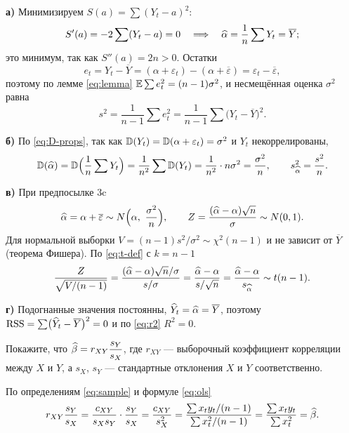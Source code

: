 \begin{solution}
\textbf{а)} Минимизируем $S(a) = \sum(Y_t - a)^2$:
\[
  S'(a) = -2\sum(Y_t - a) = 0
  \quad\Longrightarrow\quad
  \widehat{\alpha} = \frac{1}{n}\sum Y_t = \overline{Y};
\]
это минимум, так как $S''(a) = 2n > 0$. Остатки
\[
  e_t = Y_t - \overline{Y} = (\alpha + \varepsilon_t) - (\alpha + \overline{\varepsilon})
      = \varepsilon_t - \overline{\varepsilon},
\]
поэтому по лемме \eqref{eq:lemma} $\mathbb{E}\sum e_t^2 = (n-1)\sigma^2$, и несмещённая
оценка $\sigma^2$ равна
\[
  s^2 = \frac{1}{n-1}\sum e_t^2 = \frac{1}{n-1}\sum\bigl(Y_t - \overline{Y}\bigr)^2 .
\]

\medskip
\textbf{б)} По \eqref{eq:D-props}, так как $\mathbb{D}(Y_t) = \mathbb{D}(\alpha + \varepsilon_t) = \sigma^2$
и $Y_t$ некоррелированы,
\[
  \mathbb{D}(\widehat{\alpha}) = \mathbb{D}\Bigl(\frac{1}{n}\sum Y_t\Bigr) = \frac{1}{n^2}\sum\mathbb{D}(Y_t)
  = \frac{1}{n^2}\cdot n\sigma^2 = \frac{\sigma^2}{n},
  \qquad
  s_{\widehat{\alpha}}^2 = \frac{s^2}{n}.
\]

\medskip
\textbf{в)} При предпосылке 3c
\[
  \widehat{\alpha} = \alpha + \overline{\varepsilon} \sim N\Bigl(\alpha,\ \frac{\sigma^2}{n}\Bigr),
  \qquad
  Z = \frac{(\widehat{\alpha} - \alpha)\sqrt{n}}{\sigma} \sim N(0,1).
\]
Для нормальной выборки $V = (n-1)s^2/\sigma^2 \sim \chi^2(n-1)$ и не зависит от
$\overline{Y}$ (теорема Фишера). По \eqref{eq:t-def} с $k = n-1$
\[
  \frac{Z}{\sqrt{V/(n-1)}} = \frac{(\widehat{\alpha} - \alpha)\sqrt{n}/\sigma}{s/\sigma}
  = \frac{\widehat{\alpha} - \alpha}{s/\sqrt{n}} = \frac{\widehat{\alpha} - \alpha}{s_{\widehat{\alpha}}} \sim t(n-1).
\]

\medskip
\textbf{г)} Подогнанные значения постоянны, $\widehat{Y}_t = \widehat{\alpha} = \overline{Y}$, поэтому
$\mathrm{RSS} = \sum\bigl(\widehat{Y}_t - \overline{Y}\bigr)^2 = 0$ и по \eqref{eq:r2} $R^2 = 0$.
\end{solution}


Покажите, что $\widehat{\beta} = r_{XY}\dfrac{s_Y}{s_X}$, где $r_{XY}$ — выборочный
коэффициент корреляции между $X$ и $Y$, а $s_X$, $s_Y$ — стандартные отклонения
$X$ и $Y$ соответственно.

\begin{solution}
По определениям \eqref{eq:sample} и формуле \eqref{eq:ols}
\[
  r_{XY}\frac{s_Y}{s_X}
  = \frac{c_{XY}}{s_Xs_Y}\cdot\frac{s_Y}{s_X}
  = \frac{c_{XY}}{s_X^2}
  = \frac{\sum x_ty_t/(n-1)}{\sum x_t^2/(n-1)}
  = \frac{\sum x_ty_t}{\sum x_t^2}
  = \widehat{\beta} .
\]
\end{solution}


